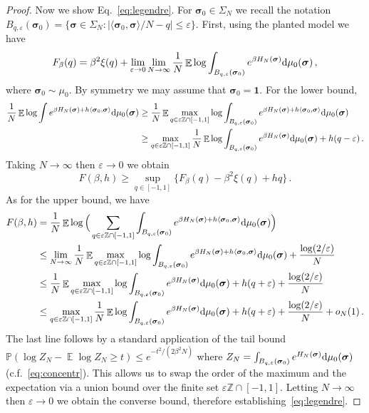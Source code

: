 \documentclass[11pt]{article}
\theoremstyle{definition}
\numberwithin{equation}{section}
\def\Z{{\mathbb Z}}
\newcommand{\<}{\langle}
\renewcommand{\>}{\rangle}
\def\bsigma{{\boldsymbol{\sigma}}}
\def\bbE{{\mathbb{E}}}
\def\de{{\rm d}}
\def\P{\mathbb{P}}
\DeclareMathOperator*{\E}{\bbE}
\def\eps{\varepsilon}
\begin{document}
\begin{proof}
Now we show Eq.~\eqref{eq:legendre}.
For $\bsigma_0 \in \Sigma_N$ we recall the notation $B_{q,\eps}(\bsigma_0) = \{\bsigma \in \Sigma_N : |\langle \bsigma_0 , \bsigma\rangle/N - q|\le \eps\}$. 
First, using the planted model we have
\[F_{\beta}(q) = \beta^2\xi(q) + \lim_{\eps \to 0}\lim_{N \to \infty}\frac{1}{N} \E\log \int_{B_{q,\eps}(\bsigma_0)}  e^{\beta H_N(\bsigma)} \de\mu_0( \bsigma)\,,\]
where $\bsigma_0 \sim \mu_0$. By symmetry we may assume that $\bsigma_0 = \mathbf{1}$.   
For the lower bound, 
\begin{align*}
    \frac{1}{N} \E \log \int  e^{\beta H_N(\bsigma) + h\langle \bsigma_0 , \bsigma \rangle} \de\mu_0( \bsigma) &\ge \frac{1}{N} \E \max_{q \in \eps \Z \cap [-1,1]} \log \int_{B_{q,\eps}(\bsigma_0)}  e^{\beta H_N(\bsigma) + h\langle \bsigma_0 , \bsigma \rangle} \de\mu_0( \bsigma)\\ 
   &\ge  \max_{q \in \eps \Z \cap [-1,1]} \frac{1}{N} \E\log \int_{B_{q,\eps}(\bsigma_0)}  e^{\beta H_N(\bsigma)} \de\mu_0( \bsigma) + h(q-\eps) \, .
\end{align*}
Taking $N \to \infty$ then $\eps \to 0$ we obtain 
\[F(\beta,h) \ge \sup_{q \in [-1,1]} \Big\{F_{\beta}(q) - \beta^2\xi(q) + hq\Big\}\,.\]
As for the upper bound, we have 
\begin{align*}
   F(\beta, h)  &=  \frac{1}{N} \E \log \Big(\sum_{q \in \eps \Z \cap [-1,1]} \int_{B_{q,\eps}(\bsigma_0)} e^{\beta H_N(\bsigma) + h\langle \bsigma_0 , \bsigma \rangle} \de\mu_0( \bsigma)\Big)\\ 
   &\le \lim_{N\to \infty} \frac{1}{N} \E \max_{q \in \eps \Z \cap [-1,1]} \log \int_{B_{q,\eps}(\bsigma_0)} e^{\beta H_N(\bsigma) + h\langle \bsigma_0 , \bsigma \rangle} \de\mu_0( \bsigma) + \frac{\log(2/\eps)}{N} \\
   &\le  \frac{1}{N} \E\max_{q \in \eps \Z \cap [-1,1]} \log \int_{B_{q,\eps}(\bsigma_0)} e^{\beta H_N(\bsigma)} \de\mu_0( \bsigma) + h(q +\eps) + \frac{\log(2/\eps)}{N}\\
   &\le   \max_{q \in \eps \Z \cap [-1,1]}\frac{1}{N} \E \log \int_{B_{q,\eps}(\bsigma_0)} e^{\beta H_N(\bsigma)} \de\mu_0( \bsigma) + h(q +\eps) + \frac{\log(2/\eps)}{N}+o_N(1)\,.
\end{align*}
The last line follows by a standard application of the tail bound $\P(\log Z_N - \E \log Z_N \ge t) \le e^{-t^2/(2\beta^2 N)}$ where $Z_N = \int_{B_{q,\eps}(\bsigma_0)} e^{H_N(\bsigma)} \de \mu_0(\bsigma)$ (c.f.~\eqref{eq:concentr}). This allows us to swap the order of the maximum and the expectation via a union bound over the finite set $\eps\Z \cap [-1,1]$. Letting $N \to \infty$ then $\eps \to 0$ we obtain the converse bound, therefore establishing~\eqref{eq:legendre}.
\end{proof}
\end{document}
